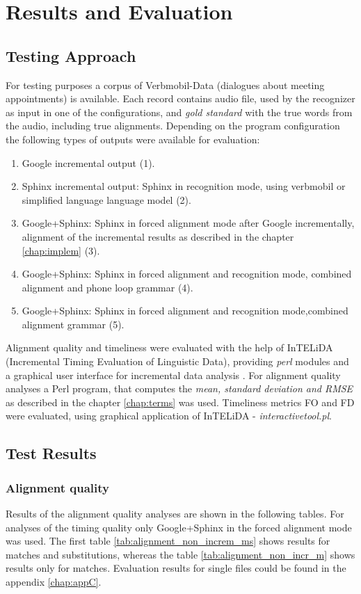 \chapter{Results and Evaluation}
\label{chap:res}
 \section {Testing Approach} 
For testing purposes  a corpus of  Verbmobil-Data (dialogues about meeting
appointments)  is available.  Each record contains audio file, used by the recognizer as input in
one of the configurations,  and \textit {gold standard}
with the true words from the audio, including true alignments.  Depending on the program configuration 
 the following types of outputs were available for evaluation:
\begin {enumerate}
  \item Google incremental output (1).
  \item Sphinx incremental output: Sphinx in recognition mode, using verbmobil
  or simplified language language model (2).
  \item Google+Sphinx: Sphinx in forced alignment mode after Google
  incrementally, alignment of the incremental results as described in the
  chapter \ref {chap:implem} (3).
  \item Google+Sphinx: Sphinx in forced alignment and recognition mode,
  combined alignment and phone loop grammar (4).
  \item Google+Sphinx: Sphinx in forced alignment and recognition mode,combined
  alignment grammar (5). 
\end{enumerate}
Alignment quality and timeliness were evaluated with the help of InTELiDA
(Incremental Timing Evaluation of Linguistic Data), providing \textit {perl} modules and a graphical
user interface for incremental data analysis \parencite {baumann2013:phd}. For
alignment quality analyses a Perl program, that computes the \textit {mean,
standard deviation and RMSE} as described in the chapter
\ref{chap:terms} was used. Timeliness metrics FO and FD were
evaluated, using graphical application of InTELiDA - \textit {interactivetool.pl}. 

\section {Test Results} 
\subsection {Alignment quality}
Results of the alignment quality analyses are shown in the following tables.
For analyses of the timing quality only Google+Sphinx in the forced alignment mode
was used. The first table \ref{tab:alignment_non_increm_ms} shows results for
matches and substitutions, whereas the table \ref{tab:alignment_non_incr_m}
shows results only for matches. Evaluation results for single files could be
found in the appendix \ref{chap:appC}. 

